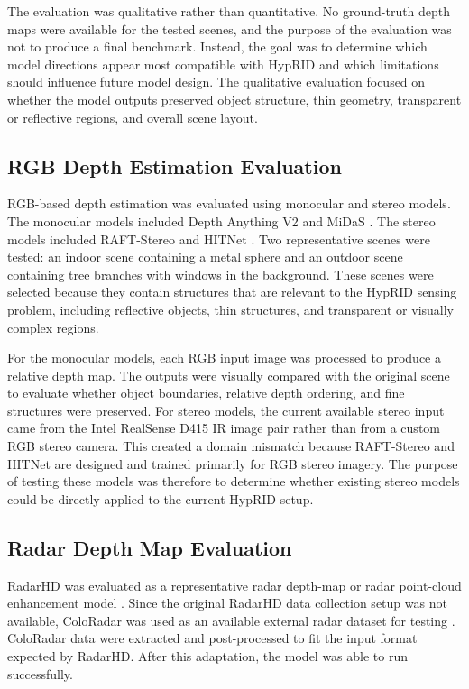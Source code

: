 \documentclass[conference]{IEEEtran}
\begin{document}
The evaluation was qualitative rather than quantitative. No ground-truth depth maps were available for the tested scenes, and the purpose of the evaluation was not to produce a final benchmark. Instead, the goal was to determine which model directions appear most compatible with HypRID and which limitations should influence future model design. The qualitative evaluation focused on whether the model outputs preserved object structure, thin geometry, transparent or reflective regions, and overall scene layout.

\subsection{RGB Depth Estimation Evaluation}

RGB-based depth estimation was evaluated using monocular and stereo models. The monocular models included Depth Anything V2 and MiDaS \cite{yang2024depthanythingv2,ranftl2022towards}. The stereo models included RAFT-Stereo and HITNet \cite{lipson2021raft,tankovich2021hitnet}. Two representative scenes were tested: an indoor scene containing a metal sphere and an outdoor scene containing tree branches with windows in the background. These scenes were selected because they contain structures that are relevant to the HypRID sensing problem, including reflective objects, thin structures, and transparent or visually complex regions.

For the monocular models, each RGB input image was processed to produce a relative depth map. The outputs were visually compared with the original scene to evaluate whether object boundaries, relative depth ordering, and fine structures were preserved. For stereo models, the current available stereo input came from the Intel RealSense D415 IR image pair rather than from a custom RGB stereo camera. This created a domain mismatch because RAFT-Stereo and HITNet are designed and trained primarily for RGB stereo imagery. The purpose of testing these models was therefore to determine whether existing stereo models could be directly applied to the current HypRID setup.

\subsection{Radar Depth Map Evaluation}

RadarHD was evaluated as a representative radar depth-map or radar point-cloud enhancement model \cite{prabhakara2023high}. Since the original RadarHD data collection setup was not available, ColoRadar was used as an available external radar dataset for testing \cite{kramer2022coloradar}. ColoRadar data were extracted and post-processed to fit the input format expected by RadarHD. After this adaptation, the model was able to run successfully.
\end{document}
